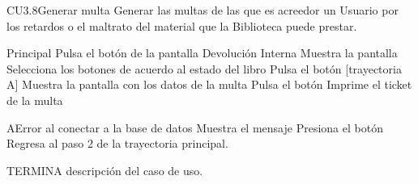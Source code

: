 
	\begin{UseCase}{CU3.8}{Generar multa}{
		Generar las multas de las que es acreedor un Usuario por los retardos o el maltrato del material que la Biblioteca puede prestar.
	}
	\end{UseCase}
	\begin{UCtrayectoria}{Principal}
		\UCpaso[\UCactor] Pulsa el botón  de la pantalla Devolución Interna
		\UCpaso[\UCsist]Muestra la pantalla 
		\UCpaso[\UCactor]Selecciona los botones de acuerdo al estado del libro
		\UCpaso[\UCactor]Pulsa el botón  [trayectoria A]
		\UCpaso[\UCsist] Muestra la pantalla  con los datos de la multa
		\UCpaso[\UCactor] Pulsa el botón 
		\UCpaso[\UCsist] Imprime el ticket de la multa
	\end{UCtrayectoria}
			
			
		\begin{UCtrayectoriaA}{A}{Error al conectar a la base de datos}
			\UCpaso[\UCsist] Muestra el mensaje 
			\UCpaso[\UCactor] Presiona el botón 
			\UCpaso[\UCsist] Regresa al paso 2 de la trayectoria principal.
		\end{UCtrayectoriaA}
TERMINA descripción del caso de uso.


